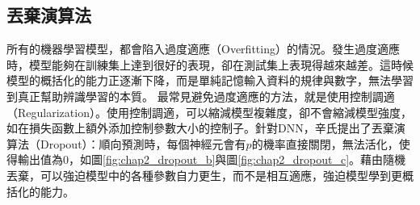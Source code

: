 \subsection{丟棄演算法}
所有的機器學習模型，都會陷入過度適應（Overfitting）的情況。發生過度適應時，模型能夠在訓練集上達到很好的表現，卻在測試集上表現得越來越差。這時候模型的概括化的能力正逐漸下降，而是單純記憶輸入資料的規律與數字，無法學習到真正幫助辨識學習的本質。
最常見避免過度適應的方法，就是使用控制調適（Regularization）。使用控制調適，可以縮減模型複雜度，卻不會縮減模型強度，如在損失函數上額外添加控制參數大小的控制子。針對DNN，辛氏提出了丟棄演算法（Dropout）：順向預測時，每個神經元會有$p$的機率直接關閉，無法活化，使得輸出值為$0$，如圖\ref{fig:chap2_dropout_b}與圖\ref{fig:chap2_dropout_c}。藉由隨機丟棄，可以強迫模型中的各種參數自力更生，而不是相互適應，強迫模型學到更概括化的能力。


